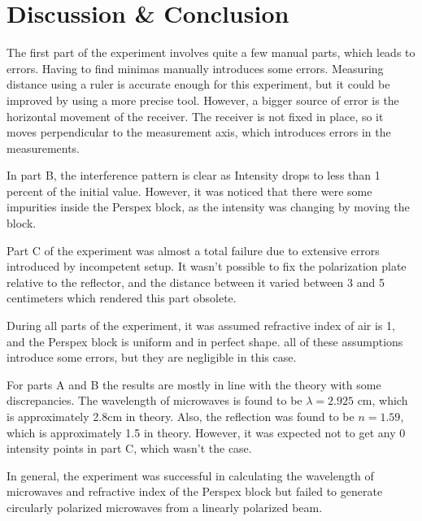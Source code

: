 \documentclass[10pt]{article}
\begin{document}
\section{Discussion \& Conclusion}

The first part of the experiment involves quite a few manual parts, which leads to errors. Having to find minimas manually introduces some errors. Measuring distance using a ruler is accurate enough for this experiment, but it could be improved by using a more precise tool.
However, a bigger source of error is the horizontal movement of the receiver. The receiver is not fixed in place, so it moves perpendicular to the measurement axis, which introduces errors in the measurements. 

In part B, the interference pattern is clear as Intensity drops to less than 1 percent of the initial value. However, it was noticed that there were some impurities inside the Perspex block, as the intensity was changing by moving the block.


Part C of the experiment was almost a total failure due to extensive errors introduced by incompetent setup. It wasn't possible to fix the polarization plate relative to the reflector, and the distance between it varied between 3 and 5 centimeters which rendered this part obsolete.

During all parts of the experiment, it was assumed refractive index of air is 1, and the Perspex block is uniform and in perfect shape. all of these assumptions introduce some errors, but they are negligible in this case.

For parts A and B the results are mostly in line with the theory with some discrepancies. The wavelength of microwaves is found to be $\lambda = 2.925$ cm, which is approximately 2.8cm in theory. Also, the reflection was found to be $n = 1.59$, which is approximately 1.5 in theory. However, it was expected not to get any 0 intensity points in part C, which wasn't the case.  

In general, the experiment was successful in calculating the wavelength of microwaves and refractive index of the Perspex block but failed to generate circularly polarized microwaves from a linearly polarized beam.
\end{document}
